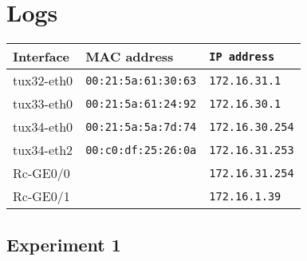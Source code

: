 \documentclass[a4paper, 11pt]{report}
\begin{document}
\fancyhfoffset{0pt}
\chapter{Logs}

\begin{center}
    \begin{tabular}{l | l | l}
        \textbf{Interface} & \textbf{MAC address}       & \texttt{IP address}    \\ \hline
        tux32-eth0         & \texttt{00:21:5a:61:30:63} & \texttt{172.16.31.1  } \\
        tux33-eth0         & \texttt{00:21:5a:61:24:92} & \texttt{172.16.30.1  } \\
        tux34-eth0         & \texttt{00:21:5a:5a:7d:74} & \texttt{172.16.30.254} \\
        tux34-eth2         & \texttt{00:c0:df:25:26:0a} & \texttt{172.16.31.253} \\
        Rc-GE0/0           & \texttt{                 } & \texttt{172.16.31.254} \\
        Rc-GE0/1           & \texttt{                 } & \texttt{172.16.1.39  } \\
    \end{tabular}
\end{center}

\section{Experiment 1}





\begin{landscape}

\end{landscape}
\end{document}
